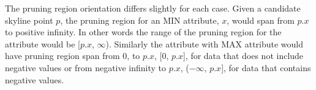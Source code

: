 \documentclass{sig-alternate}
\begin{document}
The pruning region orientation differs slightly for each case. Given
a candidate skyline point $p$, the pruning region for an MIN attribute,
$x$, would span from $p.x$ to positive infinity. In other words
the range of the pruning region for the attribute would be [$p.x$, $\infty$).
Similarly the attribute with MAX attribute would have pruning region
span from 0, to $p.x$, [0, $p.x$], for data that does not include
negative values or from negative infinity to $p.x$, ($-\infty$, $p.x$],
for data that contains negative values.






\end{document}
